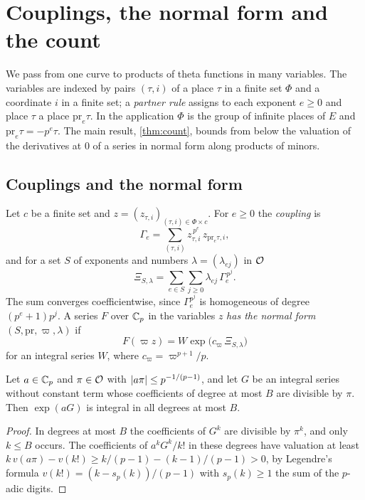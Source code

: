 \section{Couplings, the normal form and the count}\label{sec:normal-form}

We pass from one curve to products of theta functions in many variables. The variables are indexed
by pairs $(\tau,i)$ of a place $\tau$ in a finite set $\Phi$ and a coordinate $i$ in a finite set; a
\emph{partner rule} assigns to each exponent $e\ge0$ and place $\tau$ a place $\mathrm{pr}_e\tau$.
In the application $\Phi$ is the group of infinite places of $E$ and $\mathrm{pr}_e\tau=-p^e\tau$.
The main result, \cref{thm:count}, bounds from below the valuation of the derivatives at $0$ of a
series in normal form along products of minors.

\subsection{Couplings and the normal form}\label{ss:couplings}
Let $c$ be a finite set and $z=(z_{\tau,i})_{(\tau,i)\in\Phi\times c}$. For $e\ge0$ the
\emph{coupling} is
\[
  \Gamma_e=\sum_{(\tau,i)}z_{\tau,i}^{\,p^e}\,z_{\mathrm{pr}_e\tau,i},
\]
and for a set $S$ of exponents and numbers $\lambda=(\lambda_{ej})$ in $\mathcal{O}$
\[
  \Xi_{S,\lambda}=\sum_{e\in S}\sum_{j\ge0}\lambda_{ej}\,\Gamma_e^{\,p^j}.
\]
The sum converges coefficientwise, since $\Gamma_e^{p^j}$ is homogeneous of degree
$(p^e+1)p^j$. A series $F$ over $\mathbb{C}_p$ in the variables $z$ \emph{has the normal form}
$(S,\mathrm{pr},\varpi,\lambda)$ if
\[
  F(\varpi z)=W\exp\bigl(c_\varpi\,\Xi_{S,\lambda}\bigr)
\]
for an integral series $W$, where $c_\varpi=\varpi^{p+1}/p$.

\begin{lemma}\label{lem:exp-integral}
Let $a\in\mathbb{C}_p$ and $\pi\in\mathcal{O}$ with $\lvert a\pi\rvert\le p^{-1/(p-1)}$, and let $G$ be an integral series
without constant term whose coefficients of degree at most $B$ are divisible by $\pi$. Then $\exp(aG)$
is integral in all degrees at most $B$.
\end{lemma}

\begin{proof}
In degrees at most $B$ the coefficients of $G^k$ are divisible by $\pi^k$, and only $k\le B$ occurs.
The coefficients of $a^kG^k/k!$ in these degrees have valuation at least
$k\,v(a\pi)-v(k!)\ge k/(p-1)-(k-1)/(p-1)>0$, by Legendre's formula $v(k!)=(k-s_p(k))/(p-1)$ with
$s_p(k)\ge1$ the sum of the $p$-adic digits.
\end{proof}

